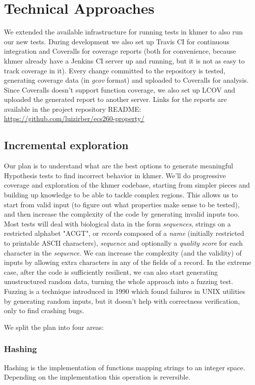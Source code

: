 \documentclass[preprint,nocopyrightspace]{sig-alternate}
\begin{document}
\section{Technical Approaches}

We extended the available infrastructure for running tests in khmer to also run our new tests.
During development we also set up Travis CI for continuous integration and Coveralls for coverage reports
(both for convenience,
because khmer already have a Jenkins CI server up and running,
but it is not as easy to track coverage in it).
Every change committed to the repository is tested,
generating coverage data (in \emph{gcov} format) and uploaded to Coveralls for analysis.
Since Coveralls doesn't support function coverage,
we also set up LCOV and uploaded the generated report to another server.
Links for the reports are available in the project repository README:
\url{https://github.com/luizirber/ecs260-property/}

\subsection{Incremental exploration}
Our plan is to understand what are the best options to generate meaningful Hypothesis tests to find incorrect behavior in khmer.
We'll do progressive coverage and exploration of the khmer codebase,
starting from simpler pieces and building up knowledge to be able to tackle complex regions.
This allows us to start from valid input (to figure out what properties make sense to be tested),
and then increase the complexity of the code by generating invalid inputs too.
Most tests will deal with biological data in the form \emph{sequences},
strings on a restricted alphabet "ACGT",
or \emph{records} composed of a \emph{name} (initially restricted to printable ASCII characters), \emph{sequence} and optionally a \emph{quality score} for each character in the \emph{sequence}.
We can increase the complexity (and the validity) of inputs by allowing extra characters in any of the fields of a record.
In the extreme case,
after the code is sufficiently resilient,
we can also start generating unustructured random data,
turning the whole approach into a fuzzing test.
Fuzzing \citet{qi2013research} is a technique introduced in 1990 which found failures in UNIX utilities by generating random inputs,
but it doesn't help with correctness verification,
only to find crashing bugs.

We split the plan into four areas:

\subsubsection{Hashing}
Hashing is the implementation of functions mapping strings to an integer space.
Depending on the implementation this operation is reversible.
\end{document}
